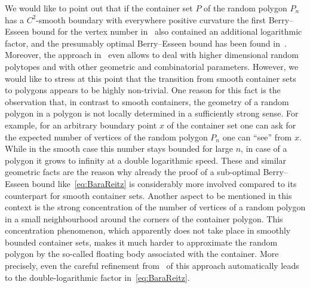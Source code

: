 \documentclass[AHL,Unicode,longabstracts,published]{cedram}
\begin{document}
We would like to point out that if the container set $P$ of the random polygon $P_n$ has a $C^2$-smooth boundary with everywhere positive curvature the first Berry--Esseen bound for the vertex number in~\cite{Reitz05} also contained an additional logarithmic factor, and the presumably optimal Berry--Esseen bound has been found in~\cite[Theorem~3.5]{LachSchulteYukich}. Moreover, the approach in~\cite{LachSchulteYukich} even allows to deal with higher dimensional random polytopes and with other geometric and combinatorial parameters. However, we would like to stress at this point that the transition from smooth container sets to polygons appears to be highly non-trivial. One reason for this fact is the observation that, in contrast to smooth containers, the geometry of a random polygon in a polygon is not locally determined in a sufficiently strong sense. For example, for an arbitrary boundary point $x$ of the container set one can ask for the expected number of vertices of the random polygon $P_n$ one can ``see'' from $x$. While in the smooth case this number stays bounded for large $n$, in case of a polygon it grows to infinity at a double logarithmic speed. These and similar geometric facts are the reason why already the proof of a sub-optimal Berry--Esseen bound like~\eqref{eq:BaraReitz} is considerably more involved compared to its counterpart for smooth container sets. Another aspect to be mentioned in this context is the strong concentration of the number of vertices of a random polygon in a small neighbourhood around the corners of the container polygon. This concentration phenomenon, which apparently does not take place in smoothly bounded container sets, makes it much harder to approximate the random polygon by the so-called floating body associated with the container. More precisely, even the careful refinement from~\cite{BR10} of this approach automatically leads to the double-logarithmic factor in~\eqref{eq:BaraReitz}.
\end{document}
